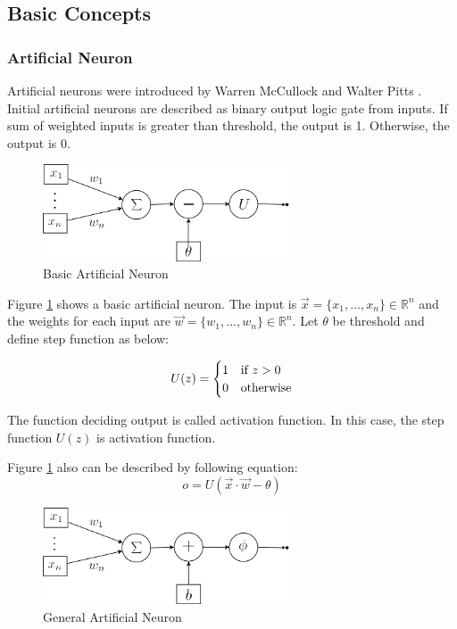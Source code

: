 \documentclass[draft,dvipsnames]{drexel-thesis}
\begin{document}
\begin{thesis}
\subsection{Basic Concepts}\label{subsec:basicDL}

\subsubsection{Artificial Neuron}\label{subsubsec:AN}
Artificial neurons were introduced by Warren McCullock and Walter Pitts \cite{raschka2015python}. Initial artificial neurons are described as binary output logic gate from inputs. If sum of weighted inputs is greater than threshold, the output is 1. Otherwise, the output is 0.

\begin{figure}[t!]
    \centering
    \includegraphics[width=0.65\textwidth]{pictures/figures/basic_AN.png}
    \caption{Basic Artificial Neuron}
    \label{fig:basic_AN}
\end{figure}

Figure \ref{fig:basic_AN} shows a basic artificial neuron. The input is $\vec{x} = \{x_1, ..., x_n\} \in \mathbb{R}^n$ and the weights for each input are $\vec{w} = \{w_1, ..., w_n\} \in \mathbb{R}^n$. Let $\theta$ be threshold and define step function as below:

$$U(z)=
	\begin{cases} 
		\hfill 1 \hfill & \text{if $z > 0$} \\
		\hfill 0 \hfill & \text{otherwise} \\
	\end{cases}
$$

The function deciding output is called activation function. In this case, the step function $U(z)$ is activation function.

Figure \ref{fig:basic_AN} also can be described by following equation:
$$ o = U(\vec{x}\cdot\vec{w}-\theta)$$

\begin{figure}[t!]
    \centering
    \includegraphics[width=0.65\textwidth]{pictures/figures/general_AN.png}
    \caption{General Artificial Neuron}
    \label{fig:general_AN}
\end{figure}


\end{thesis}
\end{document}
